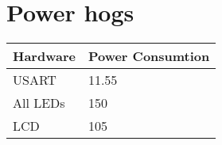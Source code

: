\documentclass[10pt, a4paper]{article}
\begin{document}
\section{Power hogs}
\begin{table}[H]
    \centering
    \begin{tabular}{l | l}
        Hardware & Power Consumtion \\
        \hline
        USART & 11.55 \\
        \hline
        All LEDs & 150 \\
        \hline
        LCD & 105
    \end{tabular}
\end{table}
\end{document}
